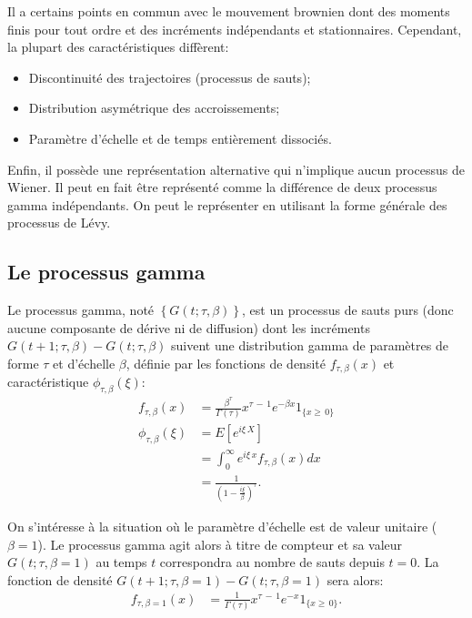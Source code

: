 Il a certains points en commun avec le mouvement brownien dont des
moments finis pour tout ordre et des incréments indépendants et
stationnaires. Cependant, la plupart des caractéristiques diffèrent:
\begin{itemize}
\item Discontinuité des trajectoires (processus de sauts);
\item Distribution asymétrique des accroissements;
\item Paramètre d'échelle et de temps entièrement dissociés.
\end{itemize}

Enfin, il possède une représentation alternative qui n'implique aucun
processus de Wiener. Il peut en fait être représenté comme la
différence de deux processus gamma indépendants. On peut le
représenter en utilisant la forme générale des processus de Lévy.

\subsection{Le processus gamma}
\label{sec:processusgamma}

Le processus gamma, noté $\left\{G(t;\tau,\beta)\right\}$, est un
processus de sauts purs (donc aucune composante de dérive ni de
diffusion) dont les incréments $G(t+1;\tau,\beta) - G(t;\tau,\beta)$
suivent une distribution gamma de paramètres de forme $\tau$ et
d'échelle $\beta$, définie par les fonctions de densité
$f_{\tau,\beta}(x)$ et caractéristique $\phi_{\tau,\beta}(\xi)$:
\begin{align}
  f_{\tau,\beta}(x) &= \frac{\beta^\tau}{\Gamma(\tau)} x^{\tau \,-\, 1} e^{- \beta x } 1_{\lbrace x\geq\,0 \rbrace} \label{eq:densitegamma} \\
  \phi_{\tau,\beta}(\xi) &= E\left[e^{i\xi\,X} \right] \nonumber\\
  &= \int_{0}^{\infty} e^{i\xi\,x} f_{\tau,\beta}(x) dx \nonumber\\
  &=
  \frac{1}{\left(1-\frac{i\xi}{\beta}\right)^{\tau}} \label{eq:fncaractgamma}.
\end{align}

On s'intéresse à la situation où le paramètre d'échelle est de valeur
unitaire ($\beta=1$). Le processus gamma agit alors à titre de
compteur et sa valeur $G(t;\tau,\beta=1)$ au temps $t$ correspondra au
nombre de sauts depuis $t=0$. La fonction de densité
$G(t+1;\tau,\beta=1) - G(t;\tau,\beta=1)$ sera alors:
\begin{align}
  f_{\tau,\beta=1}(x) &= \frac{1}{\Gamma(\tau)} x^{\tau \,-\, 1} e^{- x} 1_{\lbrace x\geq\,0 \rbrace}. \label{eq:densitegamma1}
\end{align}

